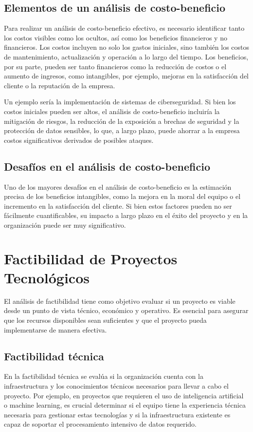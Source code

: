 \documentclass[12pt]{article}
\begin{document}
\subsection{Elementos de un análisis de costo-beneficio}
Para realizar un análisis de costo-beneficio efectivo, es necesario identificar tanto los costos visibles como los ocultos, así como los beneficios financieros y no financieros. Los costos incluyen no solo los gastos iniciales, sino también los costos de mantenimiento, actualización y operación a lo largo del tiempo. Los beneficios, por su parte, pueden ser tanto financieros como la reducción de costos o el aumento de ingresos, como intangibles, por ejemplo, mejoras en la satisfacción del cliente o la reputación de la empresa.

Un ejemplo sería la implementación de sistemas de ciberseguridad. Si bien los costos iniciales pueden ser altos, el análisis de costo-beneficio incluiría la mitigación de riesgos, la reducción de la exposición a brechas de seguridad y la protección de datos sensibles, lo que, a largo plazo, puede ahorrar a la empresa costos significativos derivados de posibles ataques.

\subsection{Desafíos en el análisis de costo-beneficio}
Uno de los mayores desafíos en el análisis de costo-beneficio es la estimación precisa de los beneficios intangibles, como la mejora en la moral del equipo o el incremento en la satisfacción del cliente. Si bien estos factores pueden no ser fácilmente cuantificables, su impacto a largo plazo en el éxito del proyecto y en la organización puede ser muy significativo.

\section{Factibilidad de Proyectos Tecnológicos}
El análisis de factibilidad tiene como objetivo evaluar si un proyecto es viable desde un punto de vista técnico, económico y operativo. Es esencial para asegurar que los recursos disponibles sean suficientes y que el proyecto pueda implementarse de manera efectiva.

\subsection{Factibilidad técnica}
En la factibilidad técnica se evalúa si la organización cuenta con la infraestructura y los conocimientos técnicos necesarios para llevar a cabo el proyecto. Por ejemplo, en proyectos que requieren el uso de inteligencia artificial o machine learning, es crucial determinar si el equipo tiene la experiencia técnica necesaria para gestionar estas tecnologías y si la infraestructura existente es capaz de soportar el procesamiento intensivo de datos requerido.
\end{document}
